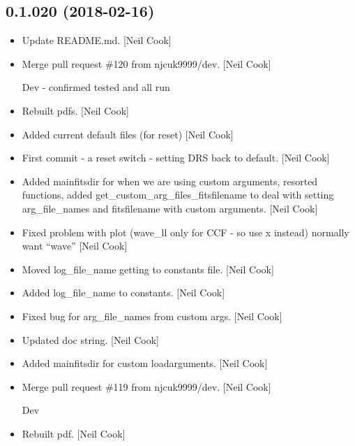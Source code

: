 \documentclass[a4paper,10pt,english]{report}
\begin{document}
\subsection{0.1.020 (2018-02-16)}
\label{\detokenize{misc/changelog:id482}}\begin{itemize}
\item {} 
Update README.md. {[}Neil Cook{]}

\item {} 
Merge pull request \#120 from njcuk9999/dev. {[}Neil Cook{]}

Dev - confirmed tested and all run

\item {} 
Rebuilt pdfs. {[}Neil Cook{]}

\item {} 
Added current default files (for reset) {[}Neil Cook{]}

\item {} 
First commit - a reset switch - setting DRS back to default. {[}Neil
Cook{]}

\item {} 
Added mainfitsdir for when we are using custom arguments, resorted
functions, added get\_custom\_arg\_files\_fitsfilename to deal with
setting arg\_file\_names and fitsfilename with custom arguments. {[}Neil
Cook{]}

\item {} 
Fixed problem with plot (wave\_ll only for CCF - so use x instead)
normally want “wave” {[}Neil Cook{]}

\item {} 
Moved log\_file\_name getting to constants file. {[}Neil Cook{]}

\item {} 
Added log\_file\_name to constants. {[}Neil Cook{]}

\item {} 
Fixed bug for arg\_file\_names from custom args. {[}Neil Cook{]}

\item {} 
Updated doc string. {[}Neil Cook{]}

\item {} 
Added mainfitsdir for custom loadarguments. {[}Neil Cook{]}

\item {} 
Merge pull request \#119 from njcuk9999/dev. {[}Neil Cook{]}

Dev

\item {} 
Rebuilt pdf. {[}Neil Cook{]}


\end{itemize}
\end{document}
